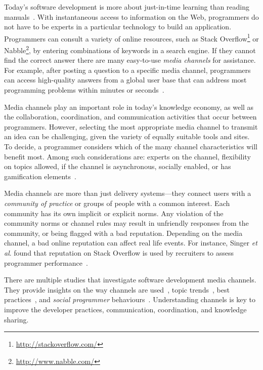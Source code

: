 \documentclass{sig-alternate-05-2015}
\begin{document}
	Today's software development is more about just-in-time learning than reading manuals~\cite{Hartmann2008}.
	With instantaneous access to information on the Web, programmers do not have to be experts in a particular technology to build an application.
	Programmers can consult a variety of online resources, such as Stack Overflow\footnote{\url{http://stackoverflow.com/}} or Nabble\footnote{\url{http://www.nabble.com/}}, by entering combinations of keywords in a search engine.
	If they cannot find the correct answer there are many easy-to-use \textit{media channels} for assistance. For example, after posting a question to a specific media channel, programmers can access high-quality answers from a global user base that can address most programming problems within minutes or seconds~\cite{Mamykina2011}.

	Media channels play an important role in today's knowledge economy, as well as the collaboration, coordination, and communication activities that occur between programmers. However, selecting the most appropriate media channel to transmit an idea can be challenging, given the variety of equally suitable tools and sites.
	To decide, a programmer considers which of the many channel characteristics will benefit most.
	Among such considerations are: experts on the channel, flexibility on topics allowed, if the channel is asynchronous, socially enabled, or has gamification elements~\cite{Vasilescu2014c}.

	Media channels are more than just delivery systems---they connect users with a \textit{community of practice} or groups of people with a common interest.
	Each community has its own implicit or explicit norms.
	Any violation of the community norms or channel rules may result in unfriendly responses from the community, or being flagged with a bad reputation.
	Depending on the media channel, a bad online reputation can affect real life events.
	For instance, Singer \textit{et al}. found that reputation on Stack Overflow is used by recruiters to assess programmer performance~\cite{Singer2013}.

	There are multiple studies that investigate software development media channels.
	They provide insights on the way channels are used~\cite{Guzzi2013, Storey2014, Singer2014},  topic trends~\cite{Barua2012, Kavaler2013, Wang2013d}, best practices~\cite{Asaduzzaman2013, Treude2011, Allamanis2013}, and \textit{social programmer} behaviours~\cite{Lang2013}.
	Understanding channels is key to improve the developer practices, communication, coordination, and knowledge sharing.
\end{document}

